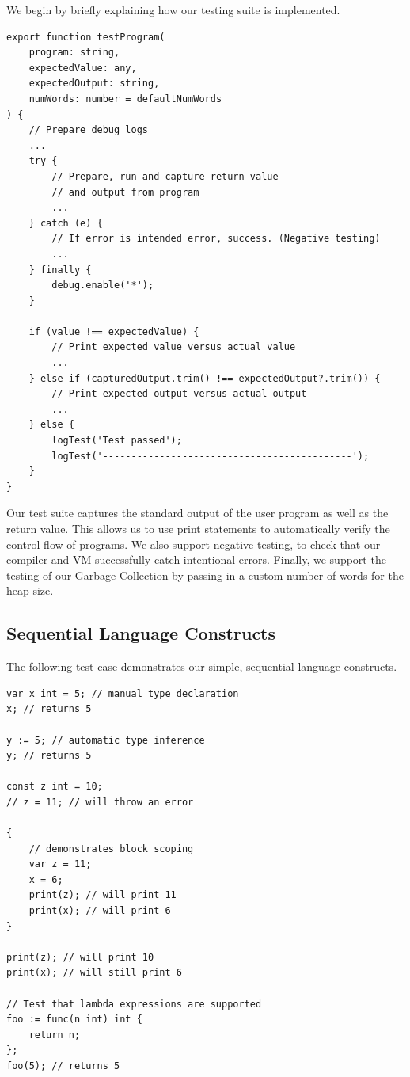 \documentclass{report}
\begin{document}
We begin by briefly explaining how our testing suite is implemented. 

\begin{verbatim}
export function testProgram(
    program: string,
    expectedValue: any,
    expectedOutput: string,
    numWords: number = defaultNumWords
) {
    // Prepare debug logs
    ...
    try {
        // Prepare, run and capture return value 
        // and output from program
        ...
    } catch (e) {
        // If error is intended error, success. (Negative testing)
        ...
    } finally {
        debug.enable('*');
    }

    if (value !== expectedValue) {
        // Print expected value versus actual value
        ...
    } else if (capturedOutput.trim() !== expectedOutput?.trim()) {
        // Print expected output versus actual output
        ...
    } else {
        logTest('Test passed');
        logTest('--------------------------------------------');
    }
}    
\end{verbatim}

Our test suite captures the standard output of the user program as well as the return value. This allows us to use print statements to automatically verify the control flow of programs. We also support negative testing, to check that our compiler and VM successfully catch intentional errors. Finally, we support the testing of our Garbage Collection by passing in a custom number of words for the heap size.

\subsection{Sequential Language Constructs}

The following test case demonstrates our simple, sequential language constructs.

\begin{verbatim}
var x int = 5; // manual type declaration
x; // returns 5

y := 5; // automatic type inference
y; // returns 5

const z int = 10;
// z = 11; // will throw an error

{
    // demonstrates block scoping
    var z = 11;
    x = 6;
    print(z); // will print 11
    print(x); // will print 6
}

print(z); // will print 10
print(x); // will still print 6

// Test that lambda expressions are supported
foo := func(n int) int {
    return n;
};
foo(5); // returns 5
\end{verbatim}
\end{document}
